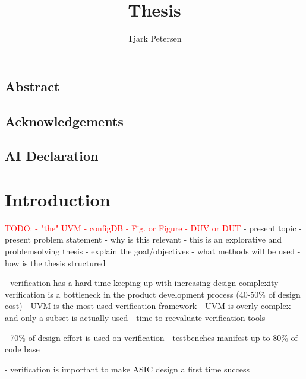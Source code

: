 \documentclass[11pt,a4paper]{report}
\author{Tjark Petersen}
\title{Thesis}
\newcommand{\todo}[1]{\textcolor{red}{TODO: #1}}
\begin{document}
\maketitle

\section*{Abstract} %

\section*{Acknowledgements} %

\section*{AI Declaration} %

\newpage

\tableofcontents

\chapter{Introduction} %

\todo{
  - "the" UVM
  - configDB
  - Fig. or Figure
  - DUV or DUT
}
- present topic
- present problem statement
- why is this relevant
- this is an explorative and problemsolving thesis
- explain the goal/objectives
- what methods will be used
- how is the thesis structured

- verification has a hard time keeping up with increasing design complexity
- verification is a bottleneck in the product development process (40-50\% of design cost) \cite{mehta2018asic}
- UVM is the most used verification framework
- UVM is overly complex and only a subset is actually used \cite{sutherland2015uvm}
- time to reevaluate verification tools

- 70\% of design effort is used on verification \cite[Ch. 1]{bergeron2012writing}
- testbenches manifest up to 80\% of code base \cite[Ch. 1]{bergeron2012writing}

- verification is important to make ASIC design a first time success \cite[Ch. 3]{bergeron2012writing}
\end{document}
